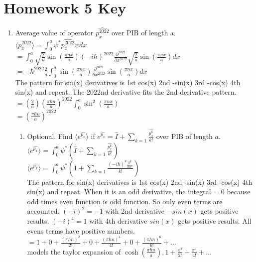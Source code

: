 \documentclass{article}
\begin{document}
\section*{Homework 5 Key}
 
\begin{enumerate}%
\item Average value of operator $\hat{p_x^{2022}}$ over PIB of length a.
\\ $ \langle p_x^{2022}\rangle = \int_0^a \psi^*\hat{p_x^{2022}}\psi dx$
\\ $ = \int_0^a \sqrt{\frac{2}{a}}\sin(\frac{\pi n x}{a}) (-i\hbar)^{2022}\frac{\partial^{2022}}{\partial x^{2022}} \sqrt{\frac{2}{a}}\sin(\frac{\pi n x}{a})dx$
\\ $ = -\hbar^{2022}\frac{2}{a}\int_0^a \sin(\frac{\pi n x}{a}) \frac{\partial^{2022}}{\partial x^{2022}} \sin(\frac{\pi n x}{a})dx$
\\The pattern for sin(x) derivatives is 1st cos(x) 2nd -sin(x) 3rd -cos(x) 4th sin(x) and repeat. The 2022nd derivative fits the 2nd derivative pattern.
\\ $ = (\frac{2}{a})(\frac{\pi\hbar n}{a})^{2022}\int_0^a \sin^2(\frac{\pi n x }{a})$
\\ $ = (\frac{\pi\hbar n}{a})^{2022}$

\begin{enumerate}
\item Optional. Find $ \langle e^{\hat{p_x}} \rangle$ if $e^{\hat{p_x}} = \hat{I}+\sum_{k=1}\frac{\hat{p_x^k}}{k!}$ over PIB of length $a$.
\\ $ \langle e^{\hat{p_x}} \rangle = \int_0^a \psi^*(\hat{I}+\sum_{k=1}\frac{\hat{p_x^k}}{k!})$
\\ $ \langle e^{\hat{p_x}} \rangle = \int_0^a \psi^*(1+\sum_{k=1}\frac{(-i\hbar)^k\frac{\partial^k}{\partial x^k}}{k!})$
\\The pattern for sin(x) derivatives is 1st cos(x) 2nd -sin(x) 3rd -cos(x) 4th sin(x) and repeat. When it is an odd derivative, the integral = 0 because odd times even function is odd function. So only even terms are accounted. $(-i)^2=-1$ with 2nd derivative $-sin(x)$ gets positive results. $(-i)^4=1$ with 4th derivative $sin(x)$ gets positive results. All evens terms have
positive numbers.
\\ $= 1 + 0 + \frac{(\pi\hbar n)^2}{2!} + 0 + \frac{(\pi\hbar n)^4}{4!} + 0 + \frac{(\pi\hbar n)^6}{6!} + ... $
\\ models the taylor expansion of $\cosh(\frac{\pi\hbar n}{a}), 1+\frac{x^2}{2!}+\frac{x^4}{4!}+...$
\end{enumerate}


\end{enumerate}
\end{document}
